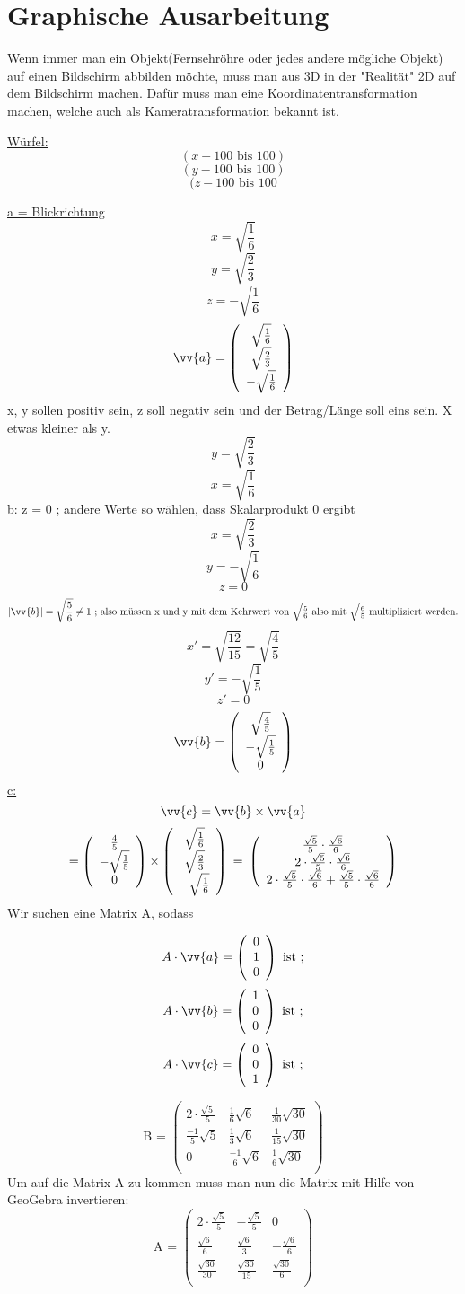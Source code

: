 \section{\textbf{Graphische Ausarbeitung}}

Wenn immer man ein Objekt(Fernsehröhre oder jedes andere mögliche Objekt) auf einen Bildschirm abbilden möchte, muss man aus 3D in der "Realität" 2D auf dem Bildschirm machen. Dafür muss man eine Koordinatentransformation machen, welche auch als Kameratransformation bekannt ist.

\underline{Würfel:}
$$(x -100 \mbox{ bis }  100)$$
$$(y-100\mbox{ bis }100)$$
$$(z-100\mbox{ bis }100$$


\underline{a = Blickrichtung}
$$x = \sqrt{\frac{1}{6}}$$
$$y = \sqrt{\frac{2}{3}}$$
$$z = -\sqrt{\frac{1}{6}}$$
$$\vv{a}=\vektor{\sqrt{\frac{1}{6}}}{\sqrt{\frac{2}{3}}}{-\sqrt{\frac{1}{6}}} $$
x, y sollen positiv sein, z soll negativ sein und der Betrag/Länge soll eins sein. X etwas kleiner als y.
$$y= \sqrt{\frac{2}{3}}$$
$$x= \sqrt{\frac{1}{6}}$$
\underline{b:}
z = 0 ; andere Werte so wählen, dass Skalarprodukt 0 ergibt
$$x= \sqrt{\frac{2}{3}}$$
$$y=-\sqrt{\frac{1}{6}}$$
$$z=0$$
$$|\vv{b}| = \sqrt{\frac{5}{6}}\neq 1\mbox{ ; also müssen x und y mit dem Kehrwert von $\sqrt{\frac{5}{6}}$ also mit $\sqrt{\frac{6}{5}}$ multipliziert werden.}$$
$$x' = \sqrt{\frac{12}{15}} = \sqrt{\frac{4}{5}}$$
$$y' = - \sqrt{\frac{1}{5}}$$
$$z' = 0$$
$$\vv{b}= \vektor{\sqrt{\frac{4}{5}}}{-\sqrt{\frac{1}{5}}}{0}$$
\underline{c:}
$$\vv{c} = \vv{b}\times  \vv{a}$$
$$= \left(\begin{array}{c}\frac{4}{5}\\-\sqrt{\frac{1}{5}}\\0\end{array}\right)
      \times \left(\begin{array}{c}\sqrt{\frac{1}{6}}\\\sqrt{\frac{2}{3}}\\-\sqrt{\frac{1}{6}}\end{array}\right) \mbox{ = } 
     \left(\begin{array}{c} 
     \frac{\sqrt{5}}{5}\cdot\frac{\sqrt{6}}{6}\\2\cdot\frac{\sqrt{5}}{5}\cdot\frac{\sqrt{6}}{6}\\2\cdot\frac{\sqrt{5}}{5}\cdot\frac{\sqrt{6}}{6}+\frac{\sqrt{5}}{5}\cdot\frac{\sqrt{6}}{6}\end{array}\right)
$$
Wir suchen eine Matrix A, sodass

     $$A\cdot \vv{a}=\vektor{0}{1}{0}\mbox{ ist ;} $$
     $$A\cdot \vv{b}=\vektor{1}{0}{0}\mbox{ ist ;}$$
     $$A\cdot \vv{c}=\vektor{0}{0}{1}\mbox{ ist ;} $$
     
$$\mbox{B = } \left(\begin{array}{ccc}
2\cdot\frac{\sqrt{5}}{5}&\frac{1}{6}\sqrt{6}&\frac{1}{30}\sqrt{30}\\
\frac{-1}{5}\sqrt{5}&\frac{1}{3}\sqrt{6}&\frac{1}{15}\sqrt{30}\\
0&\frac{-1}{6}\sqrt{6}&\frac{1}{6}\sqrt{30}\\
\end{array}\right)$$
Um auf die Matrix A zu kommen muss man nun die Matrix mit Hilfe von GeoGebra invertieren:
$$\mbox{A = }\left(\begin{array}{ccc}
2\cdot\frac{\sqrt{5}}{5}&-\frac{\sqrt{5}}{5}&0\\
\frac{\sqrt{6}}{6}&\frac{\sqrt{6}}{3}&-\frac{\sqrt{6}}{6}\\
\frac{\sqrt{30}}{30}&\frac{\sqrt{30}}{15}&\frac{\sqrt{30}}{6}\\
\end{array}\right)$$